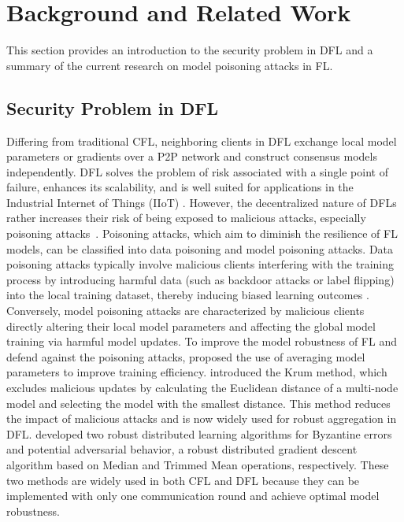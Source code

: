 \section{Background and Related Work}
This section provides an introduction to the security problem in DFL and a summary of the current research on model poisoning attacks in FL.
\subsection{Security Problem in DFL}
Differing from traditional CFL, neighboring clients in DFL exchange local model parameters or gradients over a P2P network and construct consensus models independently. DFL solves the problem of risk associated with a single point of failure, enhances its scalability, and is well suited for applications in the Industrial Internet of Things (IIoT) \cite{tan2023collusive}. However, the decentralized nature of DFLs rather increases their risk of being exposed to malicious attacks, especially poisoning attacks~\cite{feng2023voyager}. Poisoning attacks, which aim to diminish the resilience of FL models, can be classified into data poisoning and model poisoning attacks. Data poisoning attacks typically involve malicious clients interfering with the training process by introducing harmful data (such as backdoor attacks or label flipping) into the local training dataset, thereby inducing biased learning outcomes \cite{hallaji2022federated}. Conversely, model poisoning attacks are characterized by malicious clients directly altering their local model parameters and affecting the global model training via harmful model updates. To improve the model robustness of FL and defend against the poisoning attacks, \cite{mcmahan2017communication} proposed the use of averaging model parameters to improve training efficiency. \cite{blanchard2017machine} introduced the Krum method, which excludes malicious updates by calculating the Euclidean distance of a multi-node model and selecting the model with the smallest distance. This method reduces the impact of malicious attacks and is now widely used for robust aggregation in DFL.
\cite{yin2018byzantine} developed two robust distributed learning algorithms for Byzantine errors and potential adversarial behavior, a robust distributed gradient descent algorithm based on Median and Trimmed Mean operations, respectively. These two methods are widely used in both CFL and DFL because they can be implemented with only one communication round and achieve optimal model robustness.

